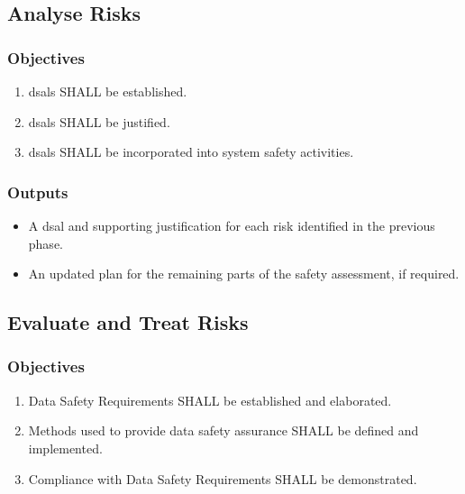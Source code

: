 \subsection{Analyse Risks}
\subsubsection{Objectives}
\begin{enumerate}[label=\color{dsiwgAccentColour}{3-\arabic*}]
	\item \Glspl{dsal} SHALL be established.
	\item \Glspl{dsal} SHALL be justified.
	\item \Glspl{dsal} SHALL be incorporated into system safety activities.
\end{enumerate}

\subsubsection{Outputs}
\begin{itemize}
	\item A \gls{dsal} and supporting justification for each risk identified in the previous phase.
	\item An updated plan for the remaining parts of the \gls{safety assessment}, if required.
\end{itemize}

\subsection{Evaluate and Treat Risks}
\subsubsection{Objectives}
\begin{enumerate}[label=\color{dsiwgAccentColour}{4-\arabic*}]
	\item {}Data Safety Requirements SHALL be established and elaborated.
	\item Methods used to provide data safety assurance SHALL be defined and implemented.
	\item Compliance with Data Safety Requirements SHALL be demonstrated.	
\end{enumerate}

